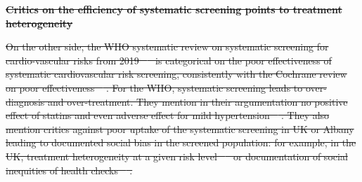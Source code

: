 \documentclass[10pt,letterpaper]{article}
\providecommand{\DIFdeltex}[1]{{\protect\color{red}\sout{#1}}}                      %
\providecommand{\DIFdelbegin}{} %
\providecommand{\DIFdelend}{} %
\providecommand{\DIFdel}[1]{\texorpdfstring{\DIFdeltex{#1}}{}} %
\newcommand{\DIFscaledelfig}{0.5}
\newlength{\DIFdelgraphicswidth} %
\newlength{\DIFdelgraphicsheight} %
\newcommand{\DIFdelincludegraphics}[2][]{%
\sbox{\DIFdelgraphicsbox}{\DIFOincludegraphics[#1]{#2}}%
\settoboxwidth{\DIFdelgraphicswidth}{\DIFdelgraphicsbox} %
\settoboxtotalheight{\DIFdelgraphicsheight}{\DIFdelgraphicsbox} %
\scalebox{\DIFscaledelfig}{%
\parbox[b]{\DIFdelgraphicswidth}{\usebox{\DIFdelgraphicsbox}\\[-\baselineskip] \rule{\DIFdelgraphicswidth}{0em}}\llap{\resizebox{\DIFdelgraphicswidth}{\DIFdelgraphicsheight}{%
\setlength{\unitlength}{\DIFdelgraphicswidth}%
\begin{picture}(1,1)%
\thicklines\linethickness{2pt} %
{\color[rgb]{1,0,0}\put(0,0){\framebox(1,1){}}}%
{\color[rgb]{1,0,0}\put(0,0){\line( 1,1){1}}}%
{\color[rgb]{1,0,0}\put(0,1){\line(1,-1){1}}}%
\end{picture}%
}\hspace*{3pt}}} %
} %
\DeclareRobustCommand{\DIFdelbegin}{\DIFOdelbegin \let\includegraphics\DIFdelincludegraphics} %
\DeclareRobustCommand{\DIFdelend}{\DIFOaddend \let\includegraphics\DIFOincludegraphics} %
\begin{document}
\DIFdelbegin \textbf{\DIFdel{Critics on the efficiency of systematic screening points to treatment heterogeneity}}
\DIFdelend %

\DIFdelbegin \DIFdel{On the other side, the WHO systematic review on systematic screening for
  cardio-vascular risks from 2019 \mbox{%
    \cite{eriksen2021effectiveness} }\hskip0pt%
  is
  categorical on the poor effectiveness of systematic cardiovascular risk
  screening, consistently with the Cochrane review on poor effectiveness
  \mbox{%
    \cite{krogsboll2012general}}\hskip0pt%
  . For the WHO, systematic screening leads to
  over-diagnosis and over-treatment. They mention in their argumentation no
  positive effect of statins and even adverse effect for mild hypertension
  \mbox{%
    \cite{diao2012pharmacotherapy}}\hskip0pt%
  . They also mention critics against poor
  uptake of the systematic screening in UK or Albany leading to documented
  social bias in the screened population: for example, in the UK, treatment
  heterogeneity at a given risk level \mbox{%
    \cite{van2013efficiency} }\hskip0pt%
  or documentation
  of social inequities of health checks \mbox{%
    \cite{krska2016implementation}}\hskip0pt%
  .
}\DIFdelend %
\end{document}
